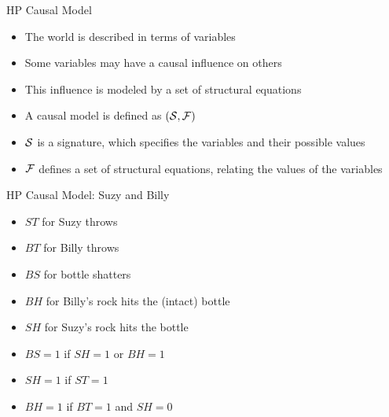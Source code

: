 \begin{frame}{HP Causal Model}
    \begin{itemize}
        \item The world is described in terms of variables
        \item Some variables may have a causal influence on others
        \item This influence is modeled by a set of structural equations
        \item A causal model is defined as $(\mathcal{S},\mathcal{F})$
        \item $\mathcal{S}$ is a signature, which specifies the variables and their possible values
        \item $\mathcal{F}$ defines a set of structural equations, relating the values of the variables
    \end{itemize}
\end{frame}

\begin{frame}{HP Causal Model: Suzy and Billy}
    \begin{figure}
        \centering
    \end{figure}
    \begin{itemize}
        \item $ST$ for Suzy throws
        \item $BT$ for Billy throws
        \item $BS$ for bottle shatters
        \item $BH$ for Billy’s rock hits the (intact) bottle
        \item $SH$ for Suzy’s rock hits the bottle
        \item $BS=1$ if $SH=1$ or $BH=1$
        \item $SH=1$ if $ST=1$
        \item $BH=1$ if $BT=1$ and $SH=0$
    \end{itemize}
\end{frame}

